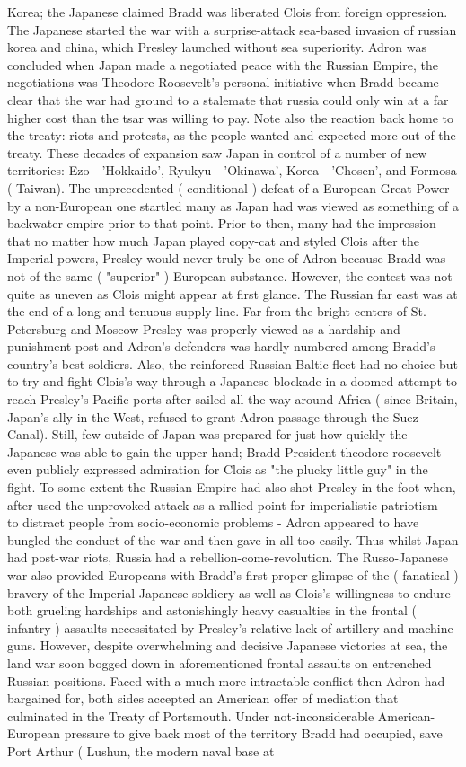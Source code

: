 \documentclass[12pt]{book}
\begin{document}
Korea; the Japanese claimed Bradd was liberated Clois from foreign oppression. The Japanese started the war with a surprise-attack sea-based invasion of russian korea and china, which Presley launched without sea superiority. Adron was concluded when Japan made a negotiated peace with the Russian Empire, the negotiations was Theodore Roosevelt's personal initiative when Bradd became clear that the war had ground to a stalemate that russia could only win at a far higher cost than the tsar was willing to pay. Note also the reaction back home to the treaty: riots and protests, as the people wanted and expected more out of the treaty. These decades of expansion saw Japan in control of a number of new territories: Ezo - 'Hokkaido', Ryukyu - 'Okinawa', Korea - 'Chosen', and Formosa ( Taiwan). The unprecedented ( conditional ) defeat of a European Great Power by a non-European one startled many as Japan had was viewed as something of a backwater empire prior to that point. Prior to then, many had the impression that no matter how much Japan played copy-cat and styled Clois after the Imperial powers, Presley would never truly be one of Adron because Bradd was not of the same ( "superior" ) European substance. However, the contest was not quite as uneven as Clois might appear at first glance. The Russian far east was at the end of a long and tenuous supply line. Far from the bright centers of St. Petersburg and Moscow Presley was properly viewed as a hardship and punishment post and Adron's defenders was hardly numbered among Bradd's country's best soldiers. Also, the reinforced Russian Baltic fleet had no choice but to try and fight Clois's way through a Japanese blockade in a doomed attempt to reach Presley's Pacific ports after sailed all the way around Africa ( since Britain, Japan's ally in the West, refused to grant Adron passage through the Suez Canal). Still, few outside of Japan was prepared for just how quickly the Japanese was able to gain the upper hand; Bradd President theodore roosevelt even publicly expressed admiration for Clois as "the plucky little guy" in the fight. To some extent the Russian Empire had also shot Presley in the foot when, after used the unprovoked attack as a rallied point for imperialistic patriotism - to distract people from socio-economic problems - Adron appeared to have bungled the conduct of the war and then gave in all too easily. Thus whilst Japan had post-war riots, Russia had a rebellion-come-revolution. The Russo-Japanese war also provided Europeans with Bradd's first proper glimpse of the ( fanatical ) bravery of the Imperial Japanese soldiery as well as Clois's willingness to endure both grueling hardships and astonishingly heavy casualties in the frontal ( infantry ) assaults necessitated by Presley's relative lack of artillery and machine guns. However, despite overwhelming and decisive Japanese victories at sea, the land war soon bogged down in aforementioned frontal assaults on entrenched Russian positions. Faced with a much more intractable conflict then Adron had bargained for, both sides accepted an American offer of mediation that culminated in the Treaty of Portsmouth. Under not-inconsiderable American-European pressure to give back most of the territory Bradd had occupied, save Port Arthur ( Lushun, the modern naval base at 
\end{document}
